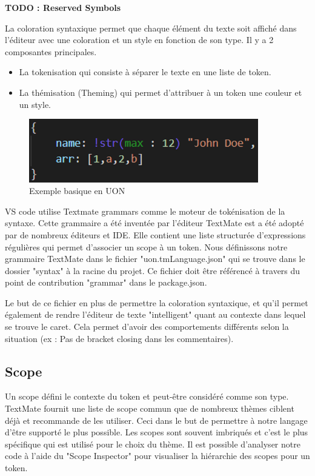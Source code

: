 \documentclass[
    iict, %
    il, %
]{heig-tb}
\begin{document}
\textbf{TODO : Reserved Symbols}

La coloration syntaxique permet que chaque élément du texte soit affiché dans l'éditeur avec une coloration et un style en fonction de son type.
Il y a 2 composantes principales.
\begin{itemize}
    \item La tokenisation qui consiste à séparer le texte en une liste de token.
    \item La thémisation (Theming) qui permet d'attribuer à un token une couleur et un style.
\end{itemize}

\begin{figure}[!h]
    \begin{center}
        \includegraphics[width=10cm]{assets/figures/basic-uon.png}
    \end{center}
    \caption[code UON]{\label{basic-uon} Exemple basique en UON}
\end{figure}


VS code utilise Textmate grammars \cite{textmate-grammars} comme le moteur de tokénisation de la syntaxe.
Cette grammaire a été inventée par l'éditeur TextMate est a été adopté par de nombreux éditeurs et IDE.
Elle contient une liste structurée d'expressions régulières qui permet d'associer un scope à un token.
Nous définissons notre grammaire TextMate dans le fichier "uon.tmLanguage.json" qui  se trouve dans le dossier "syntax" à la racine du projet.
Ce fichier doit être référencé à travers du point de contribution "grammar" dans le package.json.

Le but de ce fichier en plus de permettre la coloration syntaxique, et qu'il permet également de rendre l'éditeur de texte "intelligent" quant au contexte dans lequel se trouve le caret. Cela permet d'avoir des comportements différents selon la situation (ex : Pas de bracket closing dans les commentaires).

\subsection{Scope}
Un scope défini le contexte du token et peut-être considéré comme son type.
TextMate fournit une liste de scope commun que de nombreux thèmes ciblent déjà et recommande de les utiliser. Ceci dans le but de permettre à notre langage d'être supporté le plus possible.
Les scopes sont souvent imbriqués et c'est le plus spécifique qui est utilisé pour le choix du thème.
Il est possible d'analyser notre code à l'aide du "Scope Inspector" pour visualiser la hiérarchie des scopes pour un token.
\end{document}
